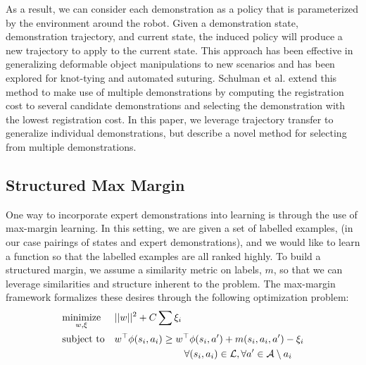 As a result, we can consider each demonstration as a policy that is parameterized by the environment around the robot.
Given a demonstration state, demonstration trajectory, and current state, the induced policy will produce a new trajectory to apply to the current state.
This approach has been effective in generalizing deformable object manipulations to new scenarios and has been explored for knot-tying and automated suturing.
Schulman et al. extend this method to make use of multiple demonstrations by computing the registration cost to several candidate demonstrations and selecting the demonstration with the lowest registration cost.
In this paper, we leverage trajectory transfer to generalize individual demonstrations, but describe a novel method for selecting from multiple demonstrations.

\subsection{Structured Max Margin}
One way to incorporate expert demonstrations into learning is through the use of max-margin learning.
In this setting, we are given a set of labelled examples,  (in our case pairings of states and expert demonstrations), and we would 
like to learn a function so that the labelled examples are all ranked highly.
To build a structured margin, we assume a similarity metric on labels, $m$,  so that we can leverage 
similarities and structure inherent to the problem.
The max-margin framework formalizes these desires through the following optimization problem:
\begin{equation}
\begin{aligned}
& \underset{w, \xi}{\text{minimize}}  & & ||w||^2 + C\sum \xi_i\\
& \text{subject to} & &w^\top \phi(s{}_i, a{}_i) \geq w^\top \phi(s{}_i, a{}') + m(s{}_i, a{}_i, a{}') - \xi_i 
\\&&&\hspace{2.5cm}\forall (s{}_i, a{}_i) \in \mathcal{L}{}, \forall a{}' \in \mathcal{A}{}\setminus a{}_i
\end{aligned}
\end{equation}


